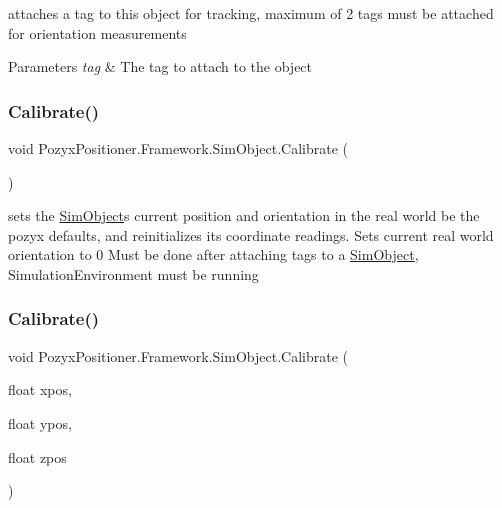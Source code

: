 attaches a tag to this object for tracking, maximum of 2 tags must be attached for orientation measurements 


\begin{DoxyParams}{Parameters}
{\em tag} & The tag to attach to the object \\
\hline
\end{DoxyParams}
\mbox{\label{class_pozyx_positioner_1_1_framework_1_1_sim_object_ae5a40c80792b6e84ae90cf31e2b5fc8f}} 
\subsubsection{\texorpdfstring{Calibrate()}{Calibrate()}\hspace{0.1cm}{\footnotesize\ttfamily [1/3]}}
{\footnotesize\ttfamily void Pozyx\+Positioner.\+Framework.\+Sim\+Object.\+Calibrate (\begin{DoxyParamCaption}{ }\end{DoxyParamCaption})}



sets the \hyperlink{class_pozyx_positioner_1_1_framework_1_1_sim_object}{Sim\+Object}\textquotesingle{}s current position and orientation in the real world be the pozyx defaults, and reinitializes its coordinate readings. Sets current real world orientation to 0 Must be done after attaching tags to a \hyperlink{class_pozyx_positioner_1_1_framework_1_1_sim_object}{Sim\+Object}, Simulation\+Environment must be running 

\mbox{\label{class_pozyx_positioner_1_1_framework_1_1_sim_object_ad5e3a7c3290c1925d0e7d42a6e8b0111}} 
\subsubsection{\texorpdfstring{Calibrate()}{Calibrate()}\hspace{0.1cm}{\footnotesize\ttfamily [2/3]}}
{\footnotesize\ttfamily void Pozyx\+Positioner.\+Framework.\+Sim\+Object.\+Calibrate (\begin{DoxyParamCaption}\item[{float}]{xpos,  }\item[{float}]{ypos,  }\item[{float}]{zpos }\end{DoxyParamCaption})}



